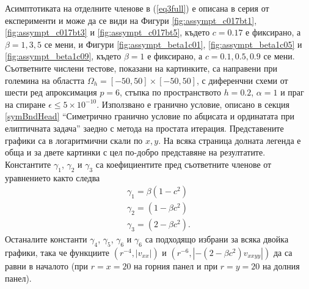 \documentclass[a4paper]{article}
\newcommand{\rf}[1]{(\ref{#1})}
\theoremstyle{remark}
\begin{document}
\begin{large}
Асимптотиката на отделните членове в \rf{eq3full} е описана в серия от експерименти и може да се види на Фигури \ref{fig:assympt_c017bt1}, \ref{fig:assympt_c017bt3} и \ref{fig:assympt_c017bt5}, където $c=0.17$ е фиксирано, а $\beta = 1, 3, 5$ се мени, и Фигури \ref{fig:assympt_beta1c01}, \ref{fig:assympt_beta1c05} и \ref{fig:assympt_beta1c09}, където $\beta=1$ е фиксирано, а $c = 0.1, 0.5, 0.9$ се мени. Съответните числени тестове, показани на картинките, са направени при големина на областта $\Omega_h = [-50, 50] \times [-50, 50]$, с диференчни схеми от шести ред апроксимация $p=6$, стъпка по пространството $h=0.2$, $\alpha = 1$ и праг на спиране $\epsilon \le 5 \times 10^{-10}$. Използвано е гранично условие, описано в секция \ref{symBndHead} ``Симетрично гранично условие по абцисата и ординатата при елиптичната задача'' заедно с метода на простата итерация. Представените графики са в логаритмични скали по $x,y$. На всяка страница долната легенда е обща и за двете картинки с цел по-добро представяне на резултатите. Константите $\gamma_1$, $\gamma_2$ и $\gamma_3$ са коефициентите пред съответните членове от уравнението както следва
\begin{align*}
\gamma_1 = \beta (1-c^2) \\
\gamma_2 = (1-\beta c^2) \\
\gamma_3 = (2-\beta c^2).
\end{align*}
Останалите константи $\gamma_4$, $\gamma_5$, $\gamma_6$ и $\gamma_6$ са подходящо избрани за всяка двойка графики, така че функциите $(r^{-4}, |v_{xx}|)$ и $(r^{-6}, |- (2-\beta c^2)v_{xxyy}|)$ да са равни в началото (при $r=x=20$ на горния панел и при $r=y=20$ на долния панел).


\end{large}
\end{document}
